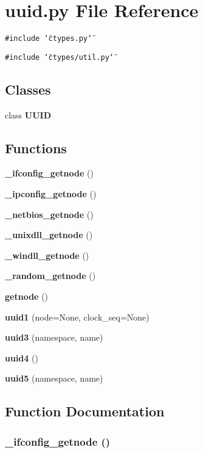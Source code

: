 \section{uuid.py File Reference}
\label{uuid_8py}
{\tt \#include \char`\"{}ctypes.py\char`\"{}}\par
{\tt \#include \char`\"{}ctypes/util.py\char`\"{}}\par
\subsection*{Classes}
\begin{CompactItemize}
\item 
class {\bf UUID}
\end{CompactItemize}
\subsection*{Functions}
\begin{CompactItemize}
\item 
{\bf \_\-ifconfig\_\-getnode} ()
\item 
{\bf \_\-ipconfig\_\-getnode} ()
\item 
{\bf \_\-netbios\_\-getnode} ()
\item 
{\bf \_\-unixdll\_\-getnode} ()
\item 
{\bf \_\-windll\_\-getnode} ()
\item 
{\bf \_\-random\_\-getnode} ()
\item 
{\bf getnode} ()
\item 
{\bf uuid1} (node=None, clock\_\-seq=None)
\item 
{\bf uuid3} (namespace, name)
\item 
{\bf uuid4} ()
\item 
{\bf uuid5} (namespace, name)
\end{CompactItemize}


\subsection{Function Documentation}
\subsubsection{\setlength{\rightskip}{0pt plus 5cm}\_\-ifconfig\_\-getnode ()}\label{uuid_8py_a0}


